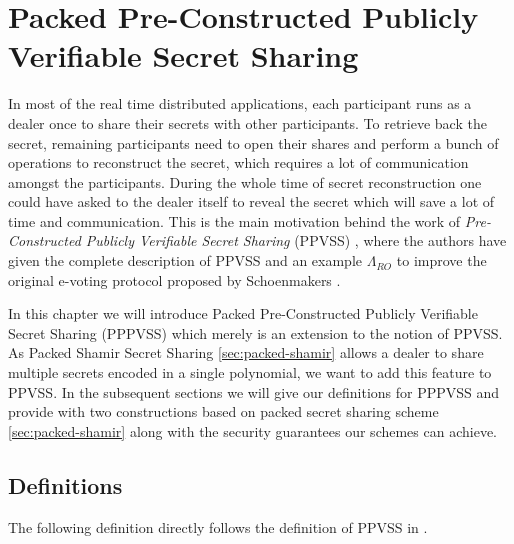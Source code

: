 \chapter{Packed Pre-Constructed Publicly Verifiable Secret Sharing}
\label{cha:2}
In most of the real time distributed applications, each participant runs as a dealer once to share their 
secrets with other participants. To retrieve back the secret, remaining participants need to open their 
shares and perform a bunch of operations to reconstruct the secret, which requires a lot of communication 
amongst the participants. During the whole time of secret reconstruction one could have asked to the dealer 
itself to reveal the secret which will save a lot of time and communication. This is the main motivation 
behind the work of \textit{Pre-Constructed Publicly Verifiable Secret Sharing} (PPVSS) \cite{cryptoeprint:2025/576}, 
where the authors have given the complete description of PPVSS and an example $\Lambda_{RO}$ to improve 
the original e-voting protocol proposed by Schoenmakers \cite{5581ccd9530540479539d21d1d39ae96}.\par

In this chapter we will introduce Packed Pre-Constructed Publicly Verifiable Secret Sharing (PPPVSS) which merely 
is an extension to the notion of PPVSS. As Packed Shamir Secret Sharing \ref{sec:packed-shamir} allows a 
dealer to share multiple secrets encoded in a single polynomial, we want to add this feature to PPVSS. In the 
subsequent sections we will give our definitions for PPPVSS and provide with two constructions based on packed secret sharing 
scheme \ref{sec:packed-shamir} along with the security guarantees our schemes can achieve.\par

\section{Definitions}
\label{sec:pppvss-definitions}

The following definition directly follows the definition of PPVSS in \cite{cryptoeprint:2025/576}.

